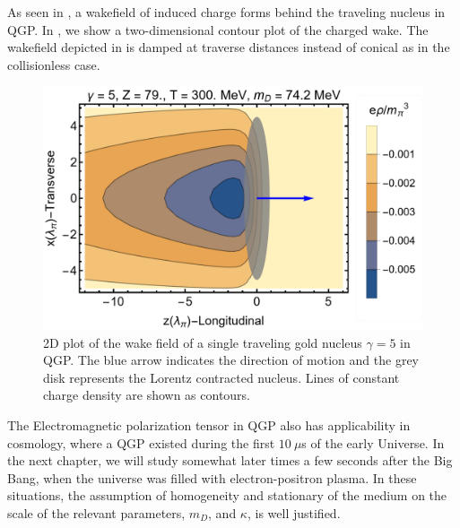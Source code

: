 As seen in , a wakefield of induced charge forms behind the traveling nucleus in QGP. In , we show a two-dimensional contour plot of the charged wake. The wakefield depicted in  is damped at traverse distances instead of conical as in the collisionless case.
\begin{figure}[h!]
\centering
\includegraphics[width=0.85\linewidth]{plots/chap02QCD/chwake.png}
\caption{2D plot of the wake field of a single traveling gold nucleus $\gamma = 5$ in QGP. The blue arrow indicates the direction of motion and the grey disk represents the Lorentz contracted nucleus. Lines of constant charge density are shown as contours. \label{fig:chgwake}}
\end{figure}


The Electromagnetic polarization tensor in QGP also has applicability in cosmology, where a QGP existed during the first $10~\mu$s of the early Universe. In the next chapter, we will study somewhat later times a few seconds after the Big Bang, when the universe was filled with electron-positron plasma. In these situations, the assumption of homogeneity and stationary of the medium on the scale of the relevant parameters, $m_D$, and $\kappa$, is well justified.







